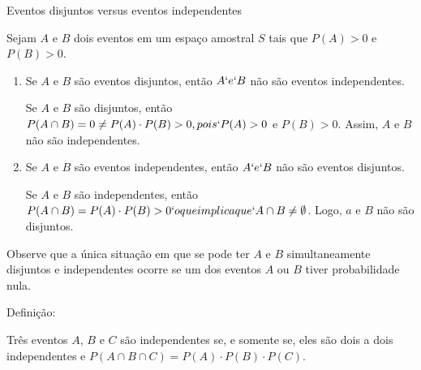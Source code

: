 \begin{example} {Eventos disjuntos versus eventos independentes}

Sejam \(A\) e \(B\) dois eventos em um espaço amostral \(S\) tais que \(P(A)>0\) e \(P(B)>0\).
\begin{enumerate}
\item {} 
Se \(A\) e \(B\) são eventos disjuntos, então \(A`e `B\) não são eventos independentes.

Se \(A\) e \(B\) são disjuntos, então \(P(A\cap B)=0\neq P(A)\cdot P(B)>0, pois `P(A)>0\) e \(P(B)>0\). Assim, \(A\) e \(B\) não são independentes.

\item {} 
Se \(A\) e \(B\) são eventos independentes, então \(A`e `B\) não são eventos disjuntos.

Se \(A\) e \(B\) são independentes, então \(P(A\cap B)=P(A)\cdot P(B)>0`o que implica que `A\cap B\neq \emptyset\). Logo, \(a\) e \(B\) não são disjuntos.

\end{enumerate}

Observe que a única situação em que se pode ter \(A\)  e \(B\)  simultaneamente disjuntos e independentes ocorre se um dos eventos \(A\) ou \(B\) tiver probabilidade nula.
\end{example}

\begin{observation}{Definição:}

Três eventos \(A\), \(B\)  e  \(C\) são independentes se, e somente se, eles são dois a dois independentes e \(P(A\cap B\cap C)=P(A)\cdot P(B)\cdot P(C)\).
\end{observation}

